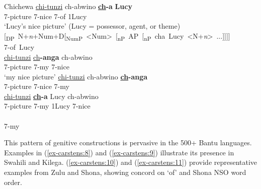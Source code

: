 \documentclass[output=paper
,modfonts
,nonflat]{langsci/langscibook}
\begin{document}
\begin{exe}
		\ex  Chichewa \citep[372, 374]{Carstens1997} \label{ex-carstens:7}
		\xlist
		\ex \label{ex-carstens:7a}
		\gll \underline{chi}\underline{-tunzi}     ch-abwino     \textbf{\underline{ch}-a}   \textbf{Lucy}\\
		7-picture   7-nice         7-of   1Lucy\\
		\glt `Lucy's nice picture'  (Lucy = possessor, agent, or theme) 	
		\ex \label{ex-carstens:7b}
		\gll \mbox{[\textsubscript{DP} N+\textit{n}+Num+D[\textsubscript{NumP} <Num> [\textsubscript{nP} AP [\textsubscript{nP} cha Lucy <N+\textit{n}> ...]]]]}\\
		\mbox{\hspace{6.7cm}7-of Lucy}\\ 
		\ex \label{ex-carstens:7c}{}
		\gll \underline{chi}\underline{-tunzi}      \underline{ch}\textbf{-anga}     ch-abwino\\
		7-picture   7-my         7-nice\\
		\glt `my nice picture'
		\ex \label{ex-carstens:7d}
		\gll  *\underline{chi}\underline{-tunzi}    ch-abwino     \textbf{\underline{ch}-anga}\\
		7-picture   7-nice      7-my\\
		\ex \label{ex-carstens:7e}
		\gll  *\underline{chi}\underline{-tunzi}    \textbf{\underline{ch}-a} Lucy     ch-abwino\\
		7-picture 7-my 1Lucy 7-nice\\
		\ex \label{ex-carstens:7f}
		\gll {}\\
		\mbox{\hspace{3.5cm}7-my}  \\
		\endxlist
\end{exe}
This pattern of genitive constructions is pervasive in the 500+ Bantu languages. Examples in (\ref{ex-carstens:8}) and (\ref{ex-carstens:9}) illustrate its presence in Swahili and Kilega. (\ref{ex-carstens:10}) and (\ref{ex-carstens:11}) provide representative examples from Zulu and Shona, showing concord on ‘of’ and Shona NSO word order.
\end{document}
